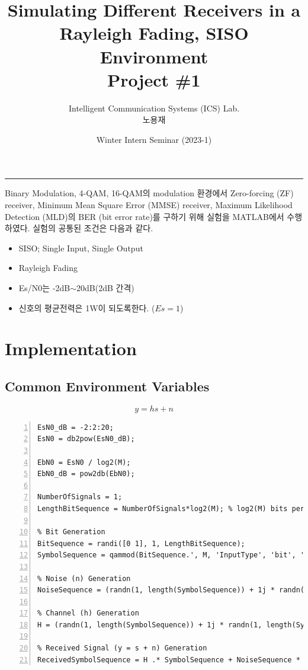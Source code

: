 \documentclass{article}
\title{Simulating Different Receivers in a \\Rayleigh Fading, SISO Environment\\
\large Project \#1}
\author{Intelligent Communication Systems (ICS) Lab.\\노용재}
\date{Winter Intern Seminar (2023-1)}
\begin{document}
\maketitle
\tableofcontents
\vspace{0.5cm}
\hrule
\vspace{0.5cm}

Binary Modulation, 4-QAM, 16-QAM의 modulation 환경에서 Zero-forcing (ZF) receiver, Minimum Mean Square Error (MMSE) receiver, Maximum Likelihood Detection (MLD)의 BER (bit error rate)를 구하기 위해 실험을 MATLAB에서 수행하였다. 실험의 공통된 조건은 다음과 같다.

\begin{itemize}
  \item SISO; Single Input, Single Output
  \item Rayleigh Fading
  \item Es/N0는 -2dB$\sim$20dB(2dB 간격)
  \item 신호의 평균전력은 1W이 되도록한다. ($Es=1$)
\end{itemize}
\clearpage
\section{Implementation}
\subsection{Common Environment Variables}
\begin{equation}
y=hs+n
\end{equation}
\begin{lstlisting}[style=Matlab-editor, frame=single, numbers=left,]
EsN0_dB = -2:2:20;
EsN0 = db2pow(EsN0_dB);

EbN0 = EsN0 / log2(M);
EbN0_dB = pow2db(EbN0);

NumberOfSignals = 1;
LengthBitSequence = NumberOfSignals*log2(M); % log2(M) bits per signal

% Bit Generation
BitSequence = randi([0 1], 1, LengthBitSequence);
SymbolSequence = qammod(BitSequence.', M, 'InputType', 'bit', 'UnitAveragePower', 1).';

% Noise (n) Generation
NoiseSequence = (randn(1, length(SymbolSequence)) + 1j * randn(1, length(SymbolSequence))) / sqrt(2); 

% Channel (h) Generation
H = (randn(1, length(SymbolSequence)) + 1j * randn(1, length(SymbolSequence))) ./ sqrt(2);

% Received Signal (y = s + n) Generation
ReceivedSymbolSequence = H .* SymbolSequence + NoiseSequence * sqrt(1 / EsN0(indx_EbN0));

\end{lstlisting}
\end{document}
